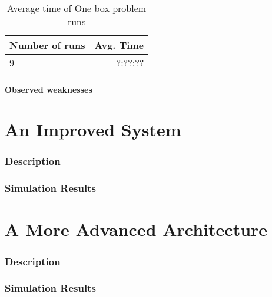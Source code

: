 \documentclass{article}
\begin{document}
\begin{table}
\centering
\begin{tabular}{ l | r}
\hline Number of runs & Avg. Time \\ \hline
9 & ?:??:?? \\
\end{tabular}
\caption{ Average time of One box problem runs}
\end{table}


\subsection{Observed weaknesses}
\part{An Improved System}

\section{Description}
\section{Simulation Results}
\part{A More Advanced Architecture}

\section{Description}
\section{Simulation Results}



\end{document}
